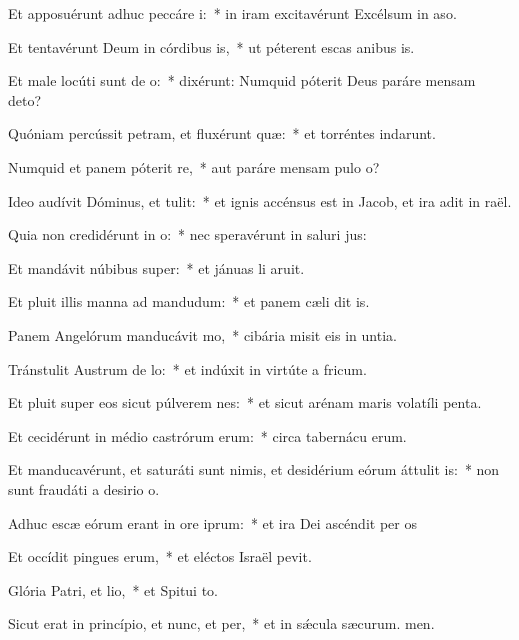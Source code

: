 \item Et apposuérunt adhuc peccáre i:~* in iram excitavérunt Excélsum in aso.
\item Et tentavérunt Deum in córdibus is,~* ut péterent escas anibus is.
\item Et male locúti sunt de o:~* dixérunt: Numquid póterit Deus paráre mensam  deto?
\item Quóniam percússit petram, et fluxérunt quæ:~* et torréntes indarunt.
\item Numquid et panem póterit re,~* aut paráre mensam pulo o?
\item Ideo audívit Dóminus, et tulit:~* et ignis accénsus est in Jacob, et ira adit in raël.
\item Quia non credidérunt in o:~* nec speravérunt in saluri jus:
\item Et mandávit núbibus super:~* et jánuas li aruit.
\item Et pluit illis manna ad mandudum:~* et panem cæli dit is.
\item Panem Angelórum manducávit mo,~* cibária misit eis in untia.
\item Tránstulit Austrum de lo:~* et indúxit in virtúte a fricum.
\item Et pluit super eos sicut púlverem nes:~* et sicut arénam maris volatíli penta.
\item Et cecidérunt in médio castrórum erum:~* circa tabernácu erum.
\item Et manducavérunt, et saturáti sunt nimis, et desidérium eórum áttulit is:~* non sunt fraudáti a desirio o.
\item Adhuc escæ eórum erant in ore iprum:~* et ira Dei ascéndit per os
\item Et occídit pingues erum,~* et eléctos Israël pevit.
\item Glória Patri, et lio,~* et Spitui to.
\item Sicut erat in princípio, et nunc, et per,~* et in sǽcula sæcurum. men.
